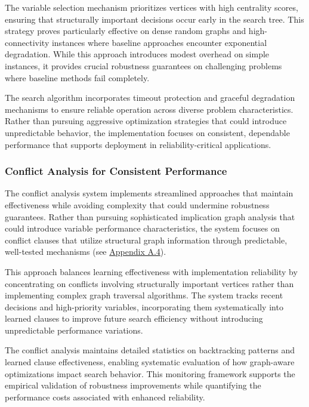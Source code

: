 The variable selection mechanism prioritizes vertices with high centrality scores, ensuring that structurally important decisions occur early in the search tree. This strategy proves particularly effective on dense random graphs and high-connectivity instances where baseline approaches encounter exponential degradation. While this approach introduces modest overhead on simple instances, it provides crucial robustness guarantees on challenging problems where baseline methods fail completely.

The search algorithm incorporates timeout protection and graceful degradation mechanisms to ensure reliable operation across diverse problem characteristics. Rather than pursuing aggressive optimization strategies that could introduce unpredictable behavior, the implementation focuses on consistent, dependable performance that supports deployment in reliability-critical applications.

\subsubsection{Conflict Analysis for Consistent Performance}

The conflict analysis system implements streamlined approaches that maintain effectiveness while avoiding complexity that could undermine robustness guarantees. Rather than pursuing sophisticated implication graph analysis that could introduce variable performance characteristics, the system focuses on conflict clauses that utilize structural graph information through predictable, well-tested mechanisms (see \hyperref[appendix:conflict-analysis]{Appendix A.4}).

This approach balances learning effectiveness with implementation reliability by concentrating on conflicts involving structurally important vertices rather than implementing complex graph traversal algorithms. The system tracks recent decisions and high-priority variables, incorporating them systematically into learned clauses to improve future search efficiency without introducing unpredictable performance variations.

The conflict analysis maintains detailed statistics on backtracking patterns and learned clause effectiveness, enabling systematic evaluation of how graph-aware optimizations impact search behavior. This monitoring framework supports the empirical validation of robustness improvements while quantifying the performance costs associated with enhanced reliability.

